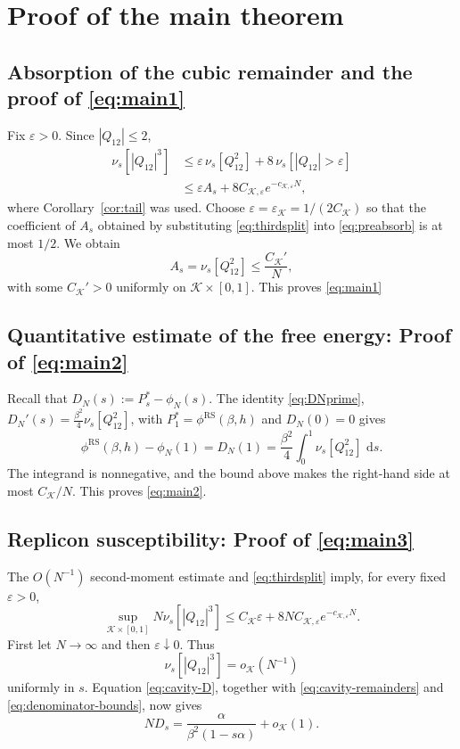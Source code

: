 \documentclass[11pt]{article}
\numberwithin{equation}{section}
\newcommand{\1}{\mathbf 1}
\newcommand{\cK}{\mathcal K}
\newcommand{\dd}{\,\mathrm d}
\begin{document}
\section{Proof of the main theorem}\label{sec:conclusion}

\subsection{Absorption of the cubic remainder and the proof of \eqref{eq:main1}}\label{subsec:absorb}

Fix $\varepsilon>0$.  Since $|Q_{12}|\le2$,
\begin{align}
 \nu_s[|Q_{12}|^3]
 &\le
 \varepsilon\,\nu_s[Q_{12}^2]
 +8\,\nu_s[|Q_{12}|>\varepsilon]\nonumber\\
 &\le
 \varepsilon A_s
 +8C_{\cK,\varepsilon}e^{-c_{\cK,\varepsilon}N},
 \label{eq:thirdsplit}
\end{align}
where Corollary~\ref{cor:tail} was used.  Choose
$\varepsilon=\varepsilon_{\cK}=1/(2C_\cK)$
so that the coefficient of $A_s$ obtained by substituting
\eqref{eq:thirdsplit} into \eqref{eq:preabsorb} is at most $1/2$.
We obtain
\[
 A_s=\nu_s[Q_{12}^2] \le\frac{C_{\cK}'}N,
\]
with some $C_\cK'>0$ uniformly on $\cK\times[0,1]$.  This proves \eqref{eq:main1}

\subsection{Quantitative estimate of the free energy: Proof of \eqref{eq:main2}}\label{subsec:freeenergy}

Recall that $D_N(s):= P_s^* -\phi_N(s)$. The identity \eqref{eq:DNprime}, $D_N'(s) = \frac{\beta^2}{4}\nu_s[Q_{12}^2]$, with $P_1^*  =  \phi^{\mathrm{RS}}(\beta,h)$ and  $D_N(0)=0$ gives
\begin{equation}
 \phi^{\mathrm{RS}}(\beta,h)-\phi_N(1)
 =D_N(1)=
 \frac{\beta^2}{4}\int_0^1\nu_s[Q_{12}^2]\,\dd s.
 \label{eq:freeenergyidentity}
\end{equation}
The integrand is nonnegative, and the  
bound above makes the right-hand side at most $C_{\cK}/N$.  This proves \eqref{eq:main2}.

\subsection{Replicon susceptibility: Proof of \eqref{eq:main3}}\label{subsec:susceptibility}

The $O(N^{-1})$ second-moment estimate and
\eqref{eq:thirdsplit} imply, for every fixed $\varepsilon>0$,
\[
 \sup_{\cK\times[0,1]}
 N\nu_s[|Q_{12}|^3]
 \le C_{\cK}\varepsilon
 +8N C_{\cK,\varepsilon}e^{-c_{\cK,\varepsilon}N}.
\]
First let $N\to\infty$ and then $\varepsilon\downarrow0$.  Thus
\[
 \nu_s[|Q_{12}|^3]=o_{\cK}(N^{-1})
\]
uniformly in $s$.  Equation \eqref{eq:cavity-D}, together with
\eqref{eq:cavity-remainders} and \eqref{eq:denominator-bounds}, now gives
\[
 ND_s
 =
 \frac{\alpha}{\beta^2(1-s\alpha)}+o_{\cK}(1).
\]
\end{document}
